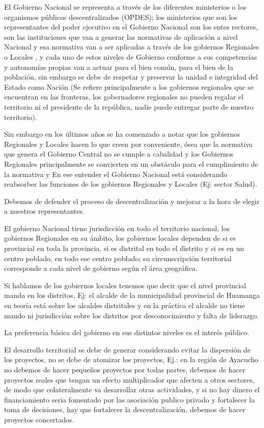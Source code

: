 \documentclass[
  a4paper,
]{article}
\begin{document}
El Gobierno Nacional se representa a través de los diferentes
ministerios o los organismos públicos descentralizados (OPDES); los
ministerios que son los representantes del poder ejecutivo en el
Gobierno Nacional son los entes rectores, son las instituciones que van
a generar las normativas de aplicación a nivel Nacional y esa normativa
van a ser aplicadas a través de los gobiernos Regionales o Locales , y
cada uno de estos niveles de Gobierno conforme a sus competencias y
autonomías propias van a actuar para el bien común, para el bien de la
población, sin embargo se debe de respetar y preservar la unidad e
integridad del Estado como Nación (Se refiere principalmente a los
gobiernos regionales que se encuentran en las fronteras, los
gobernadores regionales no pueden regalar el territorio ni el presidente
de la república, nadie puede entregar parte de nuestro territorio).

Sin embargo en los últimos años se ha comenzado a notar que los
gobiernos Regionales y Locales hacen lo que creen por conveniente, ósea
que la normativa que genera el Gobierno Central no se cumple a cabalidad
y los Gobiernos Regionales principalmente se convierten en un obstáculo
para el cumplimiento de la normativa y En ese entender el Gobierno
Nacional está considerando reabsorber las funciones de los gobiernos
Regionales y Locales (Ej: sector Salud).

Debemos de defender el proceso de descentralización y mejorar a la hora
de elegir a nuestros representantes.

El gobierno Nacional tiene jurisdicción en todo el territorio nacional,
los gobiernos Regionales en su ámbito, los gobiernos locales dependen de
si es provincial en toda la provincia, si es distrital en todo el
distrito y si es en un centro poblado, en todo ese centro poblado; su
circunscripción territorial corresponde a cada nivel de gobierno según
el área geográfica.

Si hablamos de los gobiernos locales tenemos que decir que el nivel
provincial manda en los distritos, Ej: el alcalde de la municipalidad
provincial de Huamanga en teoría está sobre los alcaldes distritales y
en la práctica el alcalde no tiene mando ni jurisdicción sobre los
distritos por desconocimiento y falta de liderazgo.

La preferencia básica del gobierno en sus distintos niveles es el
interés público.

El desarrollo territorial se debe de generar considerando evitar la
dispersión de los proyectos, no se debe de atomizar los proyectos, Ej.:
en la región de Ayacucho no debemos de hacer pequeños proyectos por
todas partes, debemos de hacer proyectos reales que tengan un efecto
multiplicador que afecten a otros sectores, de modo que colateralmente
va desarrollar otras actividades, y si no hay dinero el financiamiento
seria fomentado por las asociación publico privado y fortalecer la toma
de decisiones, hay que fortalecer la descentralización, debemos de hacer
proyectos concertados.
\end{document}
